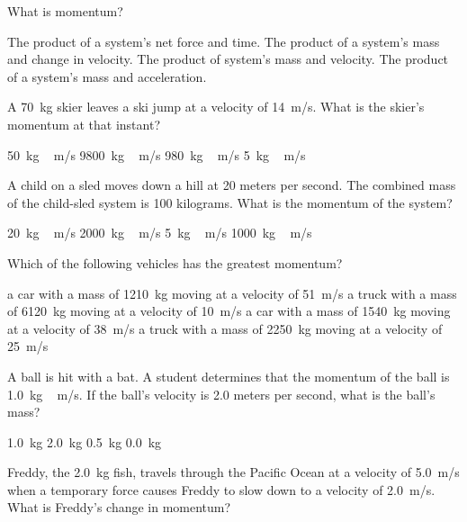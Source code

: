 \documentclass{exam}
\begin{document}
\begin{questions}

\question
What is momentum?

\begin{randomizechoices}
\choice The product of a system's net force and time.
\choice The product of a system's mass and change in velocity.
\correctchoice The product of system's mass and velocity.
\choice The product of a system's mass and acceleration.
\end{randomizechoices}

\question
A \SI{70}{kg} skier leaves a ski jump at a velocity of \SI{14}{m/s}. What is the skier's momentum at that instant?

\begin{randomizechoices}
\choice \SI{50}{kg\,m/s}
\choice \SI{9800}{kg\,m/s}
\correctchoice \SI{980}{kg\,m/s}
\choice \SI{5}{kg\,m/s}
\end{randomizechoices}

\question
A child on a sled moves down a hill at 20 meters per second. The combined mass of the child-sled system is 100 kilograms. What is the momentum of the system?

\begin{randomizechoices}
\choice \SI{20}{kg\,m/s}
\correctchoice \SI{2000}{kg\,m/s}
\choice \SI{5}{kg\,m/s}
\choice \SI{1000}{kg\,m/s}
\end{randomizechoices}

\question
Which of the following vehicles has the greatest momentum?

\begin{randomizechoices}
\correctchoice a car with a mass of \SI{1210}{kg} moving at a velocity of \SI{51}{m/s}
\choice a truck with a mass of \SI{6120}{kg} moving at a velocity of \SI{10}{m/s}
\choice a car with a mass of \SI{1540}{kg} moving at a velocity of \SI{38}{m/s}
\choice a truck with a mass of \SI{2250}{kg} moving at a velocity of \SI{25}{m/s}
\end{randomizechoices}

\question
A ball is hit with a bat. A student determines that the momentum of the ball is \SI{1.0}{kg\,m/s}. If the ball's velocity is 2.0 meters per second, what is the ball's mass?

\begin{randomizechoices}
\choice \SI{1.0}{kg}
\choice \SI{2.0}{kg}
\correctchoice \SI{0.5}{kg}
\choice \SI{0.0}{kg}
\end{randomizechoices}

\question
Freddy, the \SI{2.0}{kg} fish, travels through the Pacific Ocean at a velocity of \SI{5.0}{m/s} when a temporary force causes Freddy to slow down to a velocity of \SI{2.0}{m/s}. What is Freddy's change in momentum?


\end{questions}
\end{document}
